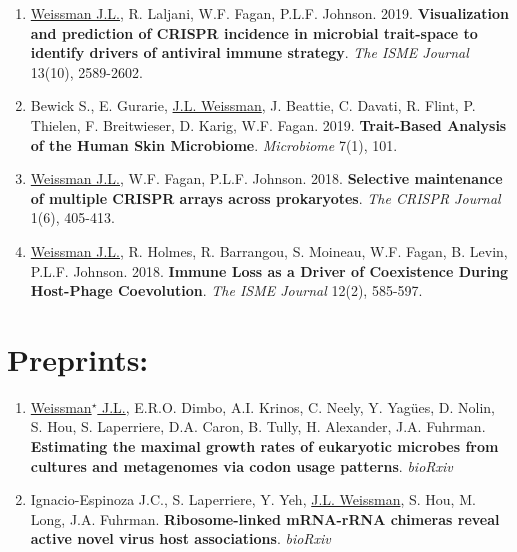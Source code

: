 \documentclass[]{res}
\begin{document}
\begin{resume}
\begin{enumerate}[leftmargin=*]
 \item \underline{Weissman J.L.}, R. Laljani, W.F. Fagan, P.L.F. Johnson. 2019. {\bf Visualization and prediction of CRISPR incidence in microbial trait-space to identify drivers of antiviral immune strategy}. \emph{The ISME Journal} 13(10), 2589-2602. %
 
 \item Bewick S., E. Gurarie, \underline{J.L. Weissman}, J. Beattie, C. Davati, R. Flint, P. Thielen, F. Breitwieser, D. Karig, W.F. Fagan. 2019. {\bf Trait-Based Analysis of the Human Skin Microbiome}. \emph{Microbiome} 7(1), 101.  %

 \item \underline{Weissman J.L.}, W.F. Fagan, P.L.F. Johnson. 2018. {\bf Selective maintenance of multiple CRISPR arrays across prokaryotes}. \emph{The CRISPR Journal} 1(6), 405-413. %
 

\item \underline{Weissman J.L.}, R. Holmes, R. Barrangou, S. Moineau, W.F. Fagan, B. Levin, P.L.F. Johnson. 2018. {\bf Immune Loss as a Driver of Coexistence During Host-Phage Coevolution}. \emph{The ISME Journal} 12(2), 585-597. %

\end{enumerate} 

 \section{Preprints:} \vspace{0mm}
  
 \begin{enumerate}[leftmargin=*]
 \setlength\itemsep{0.25em}


\item \underline{Weissman$^\star$ J.L.}, E.R.O. Dimbo, A.I. Krinos, C. Neely, Y. Yag\"{ues}, D. Nolin, S. Hou, S. Laperriere, D.A. Caron, B. Tully, H. Alexander, J.A. Fuhrman. {\bf Estimating the maximal growth rates of eukaryotic microbes from cultures and metagenomes via codon usage patterns}. \emph{bioRxiv}

\item Ignacio-Espinoza J.C., S. Laperriere, Y. Yeh, \underline{J.L. Weissman}, S. Hou, M. Long, J.A. Fuhrman. {\bf Ribosome-linked mRNA-rRNA chimeras reveal active novel virus host associations}. \emph{bioRxiv}
 

\end{enumerate} 





\end{resume} 
\end{document}
